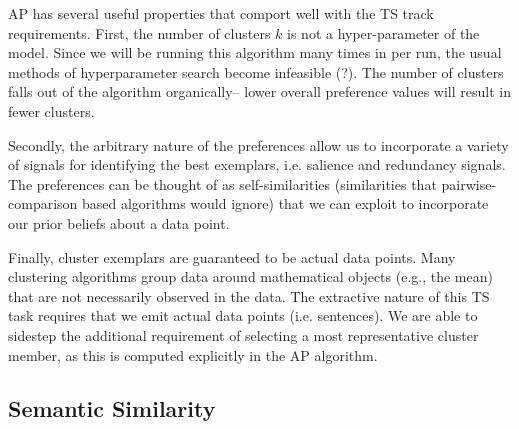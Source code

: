 \documentclass[10pt]{article} \usepackage{url} \usepackage{color}
\begin{document}
AP has several useful properties that comport well with the TS track 
requirements. First, the number of clusters $k$ is not a hyper-parameter
of the model. Since we will be running this algorithm many times in per run,
the usual methods of hyperparameter search become infeasible 
(?). The number of clusters falls out of the algorithm
organically-- lower overall preference values will result in fewer clusters. 

Secondly, the arbitrary nature of the preferences
allow us to incorporate a variety of signals for
identifying the best exemplars, i.e. salience and redundancy signals. 
The preferences can be thought of as self-similarities (similarities that
pairwise-comparison based algorithms would ignore) that we can exploit to 
incorporate our prior beliefs about a data point.

Finally, cluster exemplars are guaranteed to be actual data points. Many 
clustering algorithms group data around mathematical objects (e.g., the
mean) that are not necessarily observed in the data. The extractive nature of
this TS task requires that we emit actual data points (i.e. sentences).
We are able to sidestep 
the additional requirement of selecting a most
representative cluster member, as this is computed explicitly in the AP 
algorithm. 













\subsection{Semantic Similarity}\label{subsec:semsim}
\end{document}
